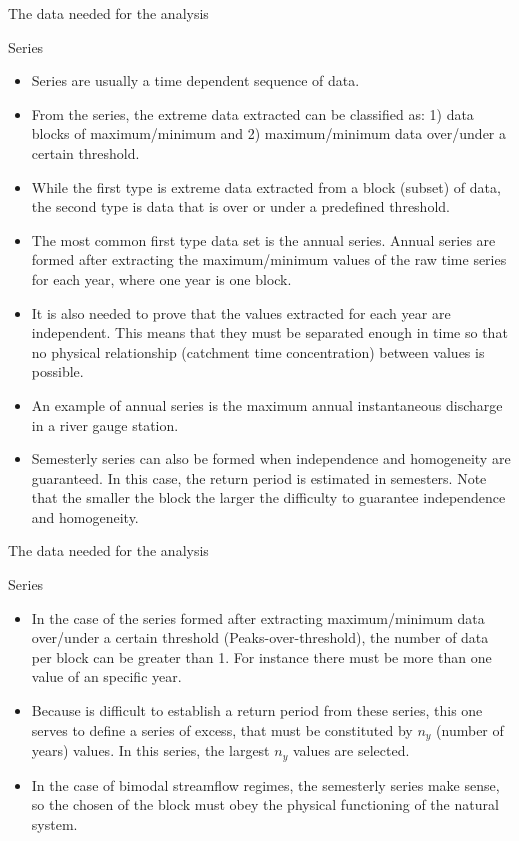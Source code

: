 \documentclass[8pt]{beamer}
\renewcommand{\emph}[1]{\textcolor{myorange}{#1}}
\begin{document}
\begin{frame}{The data needed for the analysis}
    \begin{block}{Series}
    \end{block}
        \begin{itemize}
            \item \alert{Series} are usually a \emph{time dependent} sequence of data. 
            \item From the series, the extreme data extracted can be classified as: 1) \emph{data blocks of maximum/minimum} and 2) \emph{maximum/minimum data over/under a certain threshold}. 
            \item While the first type is extreme data extracted from a block (subset) of data, the second type is data that is over or under a predefined threshold. 
            \item The most common first type data set is the \emph{annual series}. Annual series are formed after extracting the  \emph{maximum/minimum} values of the raw time series for each year, where one year is one block. 
            \item It is also needed to prove that the \emph{values} extracted for each year are \emph{independent}. This means that they must be separated enough in time so that no physical relationship (catchment time concentration) between values is possible.  
            \item An example of annual series is the maximum annual instantaneous discharge in a river gauge station. 
            \item \emph{Semesterly series} can also be formed when \emph{independence} and \emph{homogeneity} are guaranteed. In this case, the \emph{return period} is estimated in semesters. Note that the smaller the block the larger the difficulty to guarantee independence and homogeneity. 
        \end{itemize}
\end{frame}

\begin{frame}{The data needed for the analysis}
    \begin{block}{Series}
    \end{block}
        \begin{itemize}
 
            \item In the case of the series formed after extracting \emph{maximum/minimum} data over/under a certain \emph{threshold} (\alert{Peaks-over-threshold}), the number of data per block can be greater than 1. For instance there must be more than one value of an specific year.
            \item Because is difficult to establish a return period from these series, this one serves to define a series of excess, that must be constituted by $n_y$ (number of years) values. In this series, the largest $n_y$ values are selected. 
            \item In the case of \emph{bimodal} streamflow regimes, the \emph{semesterly} series make sense, so the chosen of the block must obey the \emph{physical functioning} of the natural system. 
        \end{itemize}
\end{frame}
\end{document}
